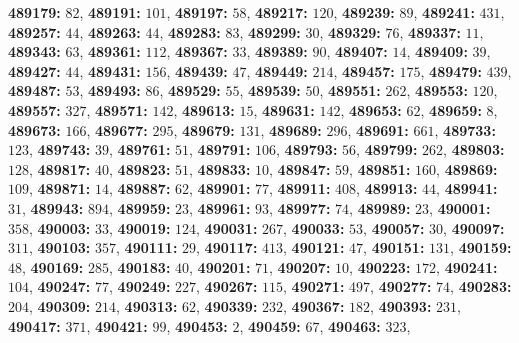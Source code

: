\textsf{\bfseries 489179:} $82$, \textsf{\bfseries 489191:} $101$, \textsf{\bfseries 489197:} $58$, \textsf{\bfseries 489217:} $120$, \textsf{\bfseries 489239:} $89$, \textsf{\bfseries 489241:} $431$, \textsf{\bfseries 489257:} $44$, \textsf{\bfseries 489263:} $44$, \textsf{\bfseries 489283:} $83$, \textsf{\bfseries 489299:} $30$, \textsf{\bfseries 489329:} $76$, \textsf{\bfseries 489337:} $11$, \textsf{\bfseries 489343:} $63$, \textsf{\bfseries 489361:} $112$, \textsf{\bfseries 489367:} $33$, \textsf{\bfseries 489389:} $90$, \textsf{\bfseries 489407:} $14$, \textsf{\bfseries 489409:} $39$, \textsf{\bfseries 489427:} $44$, \textsf{\bfseries 489431:} $156$, \textsf{\bfseries 489439:} $47$, \textsf{\bfseries 489449:} $214$, \textsf{\bfseries 489457:} $175$, \textsf{\bfseries 489479:} $439$, \textsf{\bfseries 489487:} $53$, \textsf{\bfseries 489493:} $86$, \textsf{\bfseries 489529:} $55$, \textsf{\bfseries 489539:} $50$, \textsf{\bfseries 489551:} $262$, \textsf{\bfseries 489553:} $120$, \textsf{\bfseries 489557:} $327$, \textsf{\bfseries 489571:} $142$, \textsf{\bfseries 489613:} $15$, \textsf{\bfseries 489631:} $142$, \textsf{\bfseries 489653:} $62$, \textsf{\bfseries 489659:} $8$, \textsf{\bfseries 489673:} $166$, \textsf{\bfseries 489677:} $295$, \textsf{\bfseries 489679:} $131$, \textsf{\bfseries 489689:} $296$, \textsf{\bfseries 489691:} $661$, \textsf{\bfseries 489733:} $123$, \textsf{\bfseries 489743:} $39$, \textsf{\bfseries 489761:} $51$, \textsf{\bfseries 489791:} $106$, \textsf{\bfseries 489793:} $56$, \textsf{\bfseries 489799:} $262$, \textsf{\bfseries 489803:} $128$, \textsf{\bfseries 489817:} $40$, \textsf{\bfseries 489823:} $51$, \textsf{\bfseries 489833:} $10$, \textsf{\bfseries 489847:} $59$, \textsf{\bfseries 489851:} $160$, \textsf{\bfseries 489869:} $109$, \textsf{\bfseries 489871:} $14$, \textsf{\bfseries 489887:} $62$, \textsf{\bfseries 489901:} $77$, \textsf{\bfseries 489911:} $408$, \textsf{\bfseries 489913:} $44$, \textsf{\bfseries 489941:} $31$, \textsf{\bfseries 489943:} $894$, \textsf{\bfseries 489959:} $23$, \textsf{\bfseries 489961:} $93$, \textsf{\bfseries 489977:} $74$, \textsf{\bfseries 489989:} $23$, \textsf{\bfseries 490001:} $358$, \textsf{\bfseries 490003:} $33$, \textsf{\bfseries 490019:} $124$, \textsf{\bfseries 490031:} $267$, \textsf{\bfseries 490033:} $53$, \textsf{\bfseries 490057:} $30$, \textsf{\bfseries 490097:} $311$, \textsf{\bfseries 490103:} $357$, \textsf{\bfseries 490111:} $29$, \textsf{\bfseries 490117:} $413$, \textsf{\bfseries 490121:} $47$, \textsf{\bfseries 490151:} $131$, \textsf{\bfseries 490159:} $48$, \textsf{\bfseries 490169:} $285$, \textsf{\bfseries 490183:} $40$, \textsf{\bfseries 490201:} $71$, \textsf{\bfseries 490207:} $10$, \textsf{\bfseries 490223:} $172$, \textsf{\bfseries 490241:} $104$, \textsf{\bfseries 490247:} $77$, \textsf{\bfseries 490249:} $227$, \textsf{\bfseries 490267:} $115$, \textsf{\bfseries 490271:} $497$, \textsf{\bfseries 490277:} $74$, \textsf{\bfseries 490283:} $204$, \textsf{\bfseries 490309:} $214$, \textsf{\bfseries 490313:} $62$, \textsf{\bfseries 490339:} $232$, \textsf{\bfseries 490367:} $182$, \textsf{\bfseries 490393:} $231$, \textsf{\bfseries 490417:} $371$, \textsf{\bfseries 490421:} $99$, \textsf{\bfseries 490453:} $2$, \textsf{\bfseries 490459:} $67$, \textsf{\bfseries 490463:} $323$, 
